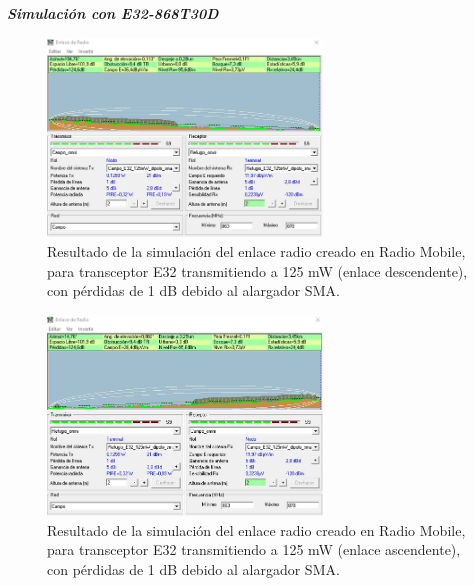 \documentclass[12pt]{article}
\begin{document}
	\noindent \textit{\textbf{Simulación con E32-868T30D}} \\
	
	\begin{figure}[h]
		\begin{center}
			\includegraphics[width=0.65\textwidth]{img/resultado_e32_125mW_conPerdidas_desc.png}
			\caption{Resultado de la simulación del enlace radio creado en Radio Mobile, para transceptor E32 transmitiendo a 125 mW (enlace descendente), con pérdidas de 1 dB debido al alargador SMA.}
			\label{fig: resultado enlace e32 125mW descendente con perdidas radio mobile}
		\end{center}
	\end{figure}
	
	\pagebreak
	
	
	\begin{figure}[h]
		\begin{center}
			\includegraphics[width=0.65\textwidth]{img/resultado_e32_125mW_conPerdidas_asc.png}
			\caption{Resultado de la simulación del enlace radio creado en Radio Mobile, para transceptor E32 transmitiendo a 125 mW (enlace ascendente), con pérdidas de 1 dB debido al alargador SMA.}
			\label{fig: resultado enlace e32 125mW ascendente con perdidas radio mobile}
		\end{center}
	\end{figure}
\end{document}
